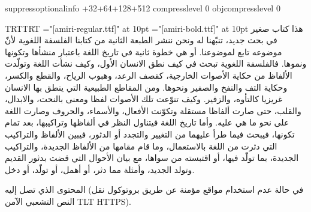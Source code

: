 \pdfvariable suppressoptionalinfo +32+64+128+512\relax
\pdfvariable compresslevel 0
\pdfvariable objcompresslevel 0




\def\btest{\begingroup}
\def\brtest{\btest\pardir TRT\textdir TRT}
\def\etest{\par\endgroup\vfill\eject}

\brtest
\font\testr="[amiri-regular.ttf]" at 10pt
\font\testb="[amiri-bold.ttf]" at 10pt
\testr
هذا كتاب صغير في بحث جديد، تنبّهنا له ونحن ننشر الطبعة الثانية من كتابنا الفلسفة
اللغوية لأنّ موضوعه تابع لموضوعنا. أو هي خطوة ثانية في تاريخ اللغة باعتبار
منشأها وتكونها ونموها. فالفلسفة اللغوية تبحث في كيف نطق الانسان الأول، وكيف
نشأت اللغة وتولّدت الألفاظ من حكاية الأصوات الخارجية، ك{\testb قصف الرعد}، وهبوب الرياح،
والقطع والكسر، وحكاية التف والنفخ والصفير ونحوها. ومن المقاطع الطبيعية التي
ينطق بها الانسان غريزيا كالتأوه، والزفير. وكيف تنوّعت تلك الأصوات لفظا ومعنى
بالنحت، والابدال، والقلب، حتى صارت ألفاظا مستقلة وتكوّنت الأفعال، والأسماء،
والحروف وصارت اللغة على نحو ما هي عليه.  وأما تاريخ اللغة فيتناول النظر في
ألفاظها وتراكيبها، بعد تمام تكونها، فيبحث فيما طرأ عليهما من التغيير والتجدد أو
الدثور، فيبين الألفاظ والتراكيب التي دثرت من اللغة بالاستعمال، وما قام مقامها
من الألفاظ الجديدة، والتراكيب الجديدة، بما تولّد فيها، أو اقتبسته من سواها، مع
بيان الأحوال التي قضت بدثور القديم وتولد الجديد، وأمثلة مما دثر، أو أهمل، أو
تولّد، أو دخل.

المحتوى الذي تصل إليه (في حالة عدم استخدام مواقع مؤمنة عن طريق بروتوكول نقل
النص التشعبي الآمن {\textdir TLT HTTPS}).
\etest

\def\arabictext{%
هذا كتاب صغير في بحث جديد، تنبّهنا له ونحن ننشر الطبعة الثانية من كتابنا الفلسفة
اللغوية لأنّ موضوعه تابع لموضوعنا. أو هي خطوة ثانية في تاريخ اللغة باعتبار
منشأها وتكونها ونموها. فالفلسفة اللغوية تبحث في كيف نطق الانسان الأول، وكيف
نشأت اللغة وتولّدت الألفاظ من حكاية الأصوات الخارجية، كقصف الرعد، وهبوب الرياح،
والقطع والكسر، وحكاية التف والنفخ والصفير ونحوها. ومن المقاطع الطبيعية التي
ينطق بها الانسان غريزيا كالتأوه، والزفير. وكيف تنوّعت تلك الأصوات لفظا ومعنى
بالنحت، والابدال، والقلب، حتى صارت ألفاظا مستقلة وتكوّنت الأفعال، والأسماء،
والحروف وصارت اللغة على نحو ما هي عليه.  وأما تاريخ اللغة فيتناول النظر في
ألفاظها وتراكيبها، بعد تمام تكونها، فيبحث فيما طرأ عليهما من التغيير والتجدد أو
الدثور، فيبين الألفاظ والتراكيب التي دثرت من اللغة بالاستعمال، وما قام مقامها
من الألفاظ الجديدة، والتراكيب الجديدة، بما تولّد فيها، أو اقتبسته من سواها، مع
بيان الأحوال التي قضت بدثور القديم وتولد الجديد، وأمثلة مما دثر، أو أهمل، أو
تولّد، أو دخل.%
}

